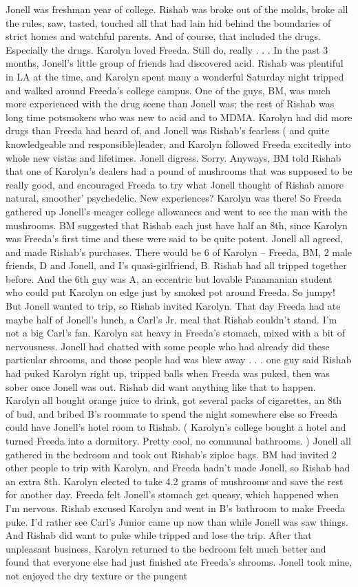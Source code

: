 \documentclass[12pt]{book}
\begin{document}
Jonell was freshman year of college. Rishab was broke out of the molds, broke all the rules, saw, tasted, touched all that had lain hid behind the boundaries of strict homes and watchful parents. And of course, that included the drugs. Especially the drugs. Karolyn loved Freeda. Still do, really . . .  In the past 3 months, Jonell's little group of friends had discovered acid. Rishab was plentiful in LA at the time, and Karolyn spent many a wonderful Saturday night tripped and walked around Freeda's college campus. One of the guys, BM, was much more experienced with the drug scene than Jonell was; the rest of Rishab was long time potsmokers who was new to acid and to MDMA. Karolyn had did more drugs than Freeda had heard of, and Jonell was Rishab's fearless ( and quite knowledgeable and responsible)leader, and Karolyn followed Freeda excitedly into whole new vistas and lifetimes. Jonell digress. Sorry. Anyways, BM told Rishab that one of Karolyn's dealers had a pound of mushrooms that was supposed to be really good, and encouraged Freeda to try what Jonell thought of Rishab amore natural, smoother' psychedelic. New experiences? Karolyn was there! So Freeda gathered up Jonell's meager college allowances and went to see the man with the mushrooms. BM suggested that Rishab each just have half an 8th, since Karolyn was Freeda's first time and these were said to be quite potent. Jonell all agreed, and made Rishab's purchases. There would be 6 of Karolyn -- Freeda, BM, 2 male friends, D and Jonell, and I's quasi-girlfriend, B. Rishab had all tripped together before. And the 6th guy was A, an eccentric but lovable Panamanian student who could put Karolyn on edge just by smoked pot around Freeda. So jumpy! But Jonell wanted to trip, so Rishab invited Karolyn. That day Freeda had ate maybe half of Jonell's lunch, a Carl's Jr. meal that Rishab couldn't stand. I'm not a big Carl's fan. Karolyn sat heavy in Freeda's stomach, mixed with a bit of nervousness. Jonell had chatted with some people who had already did these particular shrooms, and those people had was blew away . . .  one guy said Rishab had puked Karolyn right up, tripped balls when Freeda was puked, then was sober once Jonell was out. Rishab did want anything like that to happen. Karolyn all bought orange juice to drink, got several packs of cigarettes, an 8th of bud, and bribed B's roommate to spend the night somewhere else so Freeda could have Jonell's hotel room to Rishab. ( Karolyn's college bought a hotel and turned Freeda into a dormitory. Pretty cool, no communal bathrooms. ) Jonell all gathered in the bedroom and took out Rishab's ziploc bags. BM had invited 2 other people to trip with Karolyn, and Freeda hadn't made Jonell, so Rishab had an extra 8th. Karolyn elected to take 4.2 grams of mushrooms and save the rest for another day. Freeda felt Jonell's stomach get queasy, which happened when I'm nervous. Rishab excused Karolyn and went in B's bathroom to make Freeda puke. I'd rather see Carl's Junior came up now than while Jonell was saw things. And Rishab did want to puke while tripped and lose the trip. After that unpleasant business, Karolyn returned to the bedroom felt much better and found that everyone else had just finished ate Freeda's shrooms. Jonell took mine, not enjoyed the dry texture or the pungent 
\end{document}
